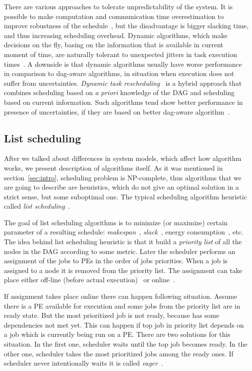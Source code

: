There are various approaches to tolerate unpredictability of the
system. It is possible to make computation and communication time
overestimation to improve robustness of the schedule~, but
the disadvantage is bigger slacking time, and thus increasing
scheduling overhead. Dynamic algorithms, which make decisions on the
fly, basing on the information that is available in current moment of
time, are naturally tolerant to unexpected jitters in task execution
times~. A downside is that dynamic algorithms usually have
worse performance in comparison to dag-aware algorithms, in situation
when execution does not suffer from uncertainties. \emph{Dynamic task
  rescheduling}~\cite{sakellariou2004low,maheswaran1998dynamic} is a
hybrid approach that combines scheduling based on \textit{a priori}
knowledge of the DAG and scheduling based on current information. Such
algorithms tend show better performance in presence of uncertainties,
if they are based on better dag-aware
algorithm~\cite{canon2008comparative}.

\subsection{List scheduling}
\label{sec:list}

After we talked about differences in system models, which affect how
algorithm works, we present description of algorithms itself. As it
was mentioned in section~\ref{sec:intro}, scheduling problem is
NP-complete, thus algorithms that we are going to describe are
heuristics, which do not give an optimal solution in a strict sense,
but some suboptimal one. The typical scheduling algorithm heuristic
called \emph{list scheduling}~\cite{adam1974, Papadimitriou1979,
  schutten1996list, kwok1999static, falzon2012enhancing,
  arabnejad2014list}.

The goal of list scheduling algorithms is to minimize (or maximize)
certain parameter of a resulting schedule:
\emph{makespan}~\cite{arabnejad2014list}, \emph{slack}~, energy
consumption~, etc. The idea behind list scheduling
heuristic is that it build a \emph{priority list} of all the nodes in
the DAG according to some metric. Later the scheduler performs an
assignment of the jobs to PEs in the order of jobs priorities. When a
job is assigned to a node it is removed from the priority list. The
assignment can take place either off-line (before actual
execution)~ or online~.

If assignment takes place online there can happen following
situation. Assume there is a PE available for execution and some jobs
from the priority list are in ready state. But the most prioritized
job is not ready, because has some dependencies not met yet. This can
happen if top job in priority list depends on a job which is currently
being run on a PE. There are two solutions for this situation. In the
first one, scheduler waits until the top job becomes ready. In the
other one, scheduler takes the most prioritized jobs among the ready
ones. If scheduler never intentionally waits it is called
\emph{eager}~\cite{canon2007comparison}.

